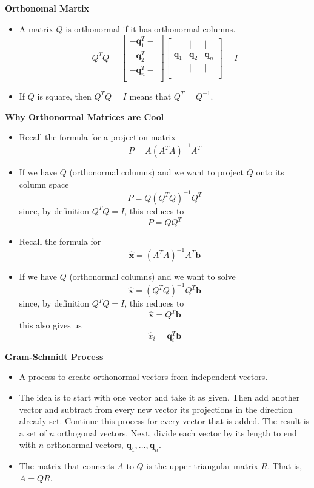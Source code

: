 \documentclass[11pt]{article}
\begin{document}
\textbf{Orthonomal Martix}
\begin{itemize}
    \item A matrix $Q$ is orthonormal if it has orthonormal columns.
    \[ Q^T Q =
    \begin{bmatrix}
        - \boldsymbol{q}_1^T - \\
        - \boldsymbol{q}_2^T - \\
        - \boldsymbol{q}_n^T - \\
    \end{bmatrix}
    \begin{bmatrix}
        | & | & | \\
        \boldsymbol{q}_1 & \boldsymbol{q}_2 & \boldsymbol{q}_n \\
        | & | & | \\
    \end{bmatrix} =
    I
    \]
    \item If $Q$ is square, then $Q^T Q = I$ means that $Q^T = Q^{-1}$.
\end{itemize}

\textbf{Why Orthonormal Matrices are Cool}
\begin{itemize}
    \item Recall the formula for a projection matrix 
    \[P = A {(A^T A)}^{-1}A^T\]
    \item If we have $Q$ (orthonormal columns) and we want to project $Q$ onto its column 
    space
    \[P = Q {(Q^T Q)}^{-1}Q^T\]
    since, by definition $Q^T Q = I$, this reduces to
    \[P = Q Q^T\]
    \item  Recall the formula for 
    \[\boldsymbol{\hat{x}} = {(A^T A)}^{-1} A^T \boldsymbol{b}\]
    \item If we have $Q$ (orthonormal columns) and we want to solve
    \[\boldsymbol{\hat{x}} = {(Q^T Q)}^{-1} Q^T \boldsymbol{b}\]
    since, by definition $Q^T Q = I$, this reduces to
    \[\boldsymbol{\hat{x}} = Q^T \boldsymbol{b}\]
    this also gives us
    \[\hat{x}_i = \boldsymbol{q}_i^T \boldsymbol{b}\]
\end{itemize}

\textbf{Gram-Schmidt Process}
\begin{itemize}
    \item A process to create orthonormal vectors from independent vectors.
    \item The idea is to start with one vector and take it as given. Then add another vector
    and subtract from every new vector its projections in the direction already set. Continue 
    this process for every vector that is added. The result is a set of $n$ orthogonal vectors.
    Next, divide each vector by its length to end with $n$ orthonormal vectors, 
    $\boldsymbol{q}_1, \ldots,  \boldsymbol{q}_n$.
    \item The matrix that connects $A$ to $Q$ is the upper triangular matrix $R$. That is, 
    $A=QR$.
\end{itemize}
\end{document}

